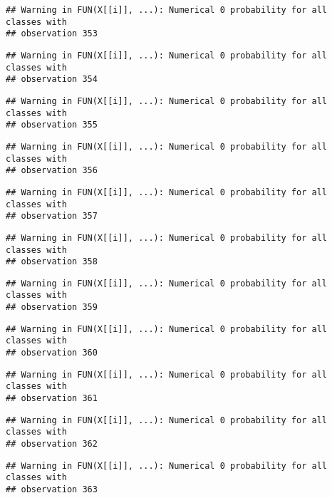 \documentclass[
]{article}
\begin{document}
\begin{verbatim}
## Warning in FUN(X[[i]], ...): Numerical 0 probability for all classes with
## observation 353
\end{verbatim}

\begin{verbatim}
## Warning in FUN(X[[i]], ...): Numerical 0 probability for all classes with
## observation 354
\end{verbatim}

\begin{verbatim}
## Warning in FUN(X[[i]], ...): Numerical 0 probability for all classes with
## observation 355
\end{verbatim}

\begin{verbatim}
## Warning in FUN(X[[i]], ...): Numerical 0 probability for all classes with
## observation 356
\end{verbatim}

\begin{verbatim}
## Warning in FUN(X[[i]], ...): Numerical 0 probability for all classes with
## observation 357
\end{verbatim}

\begin{verbatim}
## Warning in FUN(X[[i]], ...): Numerical 0 probability for all classes with
## observation 358
\end{verbatim}

\begin{verbatim}
## Warning in FUN(X[[i]], ...): Numerical 0 probability for all classes with
## observation 359
\end{verbatim}

\begin{verbatim}
## Warning in FUN(X[[i]], ...): Numerical 0 probability for all classes with
## observation 360
\end{verbatim}

\begin{verbatim}
## Warning in FUN(X[[i]], ...): Numerical 0 probability for all classes with
## observation 361
\end{verbatim}

\begin{verbatim}
## Warning in FUN(X[[i]], ...): Numerical 0 probability for all classes with
## observation 362
\end{verbatim}

\begin{verbatim}
## Warning in FUN(X[[i]], ...): Numerical 0 probability for all classes with
## observation 363
\end{verbatim}
\end{document}
